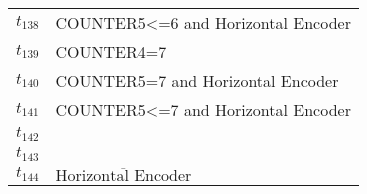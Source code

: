 \begin{table}[H]
\begin{tabular}{M{5cm}M{10cm}}
\hyperlink{partialNet:t138}{\hypertarget{partialTable:t138}{$t_{138}$}} & COUNTER5<=6 and Horizontal Encoder\\
\hyperlink{partialNet:t139}{\hypertarget{partialTable:t139}{$t_{139}$}} & COUNTER4=7\\
\hyperlink{partialNet:t140}{\hypertarget{partialTable:t140}{$t_{140}$}} & COUNTER5=7 and Horizontal Encoder\\
\hyperlink{partialNet:t141}{\hypertarget{partialTable:t141}{$t_{141}$}} & COUNTER5<=7 and Horizontal Encoder\\
\hyperlink{partialNet:t142}{\hypertarget{partialTable:t142}{$t_{142}$}} & \\
\hyperlink{partialNet:t143}{\hypertarget{partialTable:t143}{$t_{143}$}} & \\
\hyperlink{partialNet:t144}{\hypertarget{partialTable:t144}{$t_{144}$}} & \(\overline{\mbox{Horizontal Encoder}}\)\\
\end{tabular}
\end{table}
